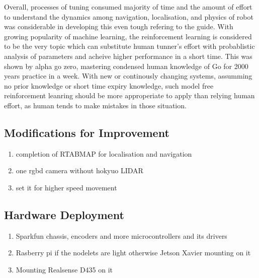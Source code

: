 \documentclass[10pt,journal,compsoc]{IEEEtran}
\begin{document}
Overall, processes of tuning consumed majority of time and the amount of effort to understand the dynamics among navigation, localisation, and physics of robot was considerable in developing this even tough refering to the guide. With growing popularity of machine learning, the reinforcement learning is considered to be the very topic which can substitute human tunner's effort with probablistic analysis of parameters and acheive higher performance in a short time. This was shown by alpha go zero, mastering condensed human knowledge of Go for 2000 years  practice in a week. With new or continously changing systems, assumming no prior knowledge or short time expiry knowledge, such model free reinforcement leanring should be more approperiate to apply than relying human effort, as human tends to make mistakes in those situation.


\subsection{Modifications for Improvement}
\begin{enumerate}
      \item completion of RTABMAP for localisation and navigation
      \item one rgbd camera without hokyuo LIDAR
      \item set it for higher speed movement
      \end{enumerate}
\subsection{Hardware Deployment}
\begin{enumerate}
\item Sparkfun chassis, encoders and more microcontrollers and its drivers
\item Rasberry pi if the nodelets are light otherwise Jetson Xavier mounting on it
\item Mounting Realsense D435 on it
\end{enumerate}



\end{document}
